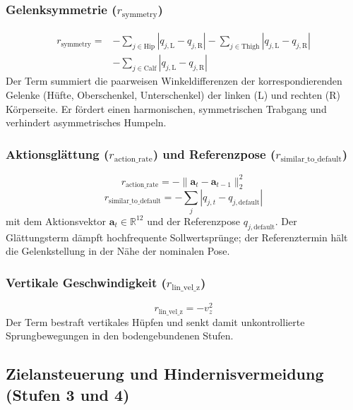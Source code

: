 \subsubsection{Gelenksymmetrie ($r_{\text{symmetry}}$)}
\begin{equation}\label{eq:nav_symmetry_term}
\begin{aligned}
r_{\text{symmetry}} ={}& -\sum_{j\in\text{Hip}} |q_{j,\text{L}} - q_{j,\text{R}}| - \sum_{j\in\text{Thigh}} |q_{j,\text{L}} - q_{j,\text{R}}| \\
&- \sum_{j\in\text{Calf}} |q_{j,\text{L}} - q_{j,\text{R}}|
\end{aligned}
\end{equation}
Der Term summiert die paarweisen Winkeldifferenzen der korrespondierenden Gelenke (Hüfte, Oberschenkel, Unterschenkel) der linken (L) und rechten (R) Körperseite. Er fördert einen harmonischen, symmetrischen Trabgang und verhindert asymmetrisches Humpeln.

\subsubsection{Aktionsglättung ($r_{\text{action\_rate}}$) und Referenzpose ($r_{\text{similar\_to\_default}}$)}
\begin{equation}\label{eq:nav_action_rate}
r_{\text{action\_rate}} = -\lVert \mathbf{a}_t - \mathbf{a}_{t-1}\rVert_2^2
\end{equation}
\begin{equation}\label{eq:nav_similar_to_default}
r_{\text{similar\_to\_default}} = -\sum_{j} \left|q_{j,t} - q_{j,\text{default}}\right|
\end{equation}
mit dem Aktionsvektor $\mathbf{a}_t\in\mathbb{R}^{12}$ und der Referenzpose $q_{j,\text{default}}$. Der Glättungsterm dämpft hochfrequente Sollwertsprünge; der Referenztermin hält die Gelenkstellung in der Nähe der nominalen Pose.

\subsubsection{Vertikale Geschwindigkeit ($r_{\text{lin\_vel\_z}}$)}
\begin{equation}\label{eq:nav_lin_vel_z}
r_{\text{lin\_vel\_z}} = -v_z^2
\end{equation}
Der Term bestraft vertikales Hüpfen und senkt damit unkontrollierte Sprungbewegungen in den bodengebundenen Stufen.

\subsection{Zielansteuerung und Hindernisvermeidung (Stufen 3 und 4)}

